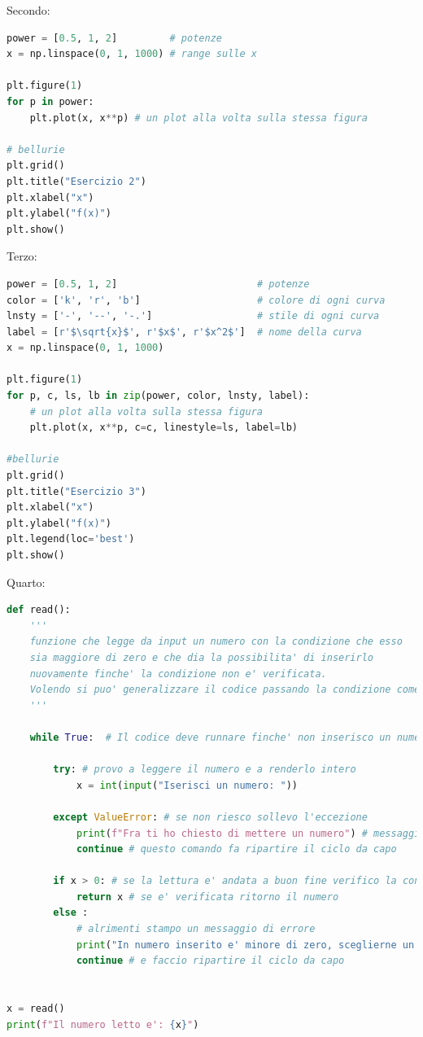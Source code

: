 \documentclass[10pt,a4paper]{article}
\begin{document}
\FloatBarrier
\noindent Secondo:
\begin{lstlisting}[language=Python]
power = [0.5, 1, 2]         # potenze
x = np.linspace(0, 1, 1000) # range sulle x

plt.figure(1)
for p in power:
    plt.plot(x, x**p) # un plot alla volta sulla stessa figura

# bellurie
plt.grid()
plt.title("Esercizio 2")
plt.xlabel("x")
plt.ylabel("f(x)")
plt.show()
\end{lstlisting}
Terzo:
\begin{lstlisting}[language=Python]
power = [0.5, 1, 2]                        # potenze
color = ['k', 'r', 'b']                    # colore di ogni curva
lnsty = ['-', '--', '-.']                  # stile di ogni curva
label = [r'$\sqrt{x}$', r'$x$', r'$x^2$']  # nome della curva
x = np.linspace(0, 1, 1000)

plt.figure(1)
for p, c, ls, lb in zip(power, color, lnsty, label):
    # un plot alla volta sulla stessa figura
    plt.plot(x, x**p, c=c, linestyle=ls, label=lb)

#bellurie
plt.grid()
plt.title("Esercizio 3")
plt.xlabel("x")
plt.ylabel("f(x)")
plt.legend(loc='best')
plt.show()
\end{lstlisting}
Quarto:
\begin{lstlisting}[language=Python]
def read():
    '''
    funzione che legge da input un numero con la condizione che esso
    sia maggiore di zero e che dia la possibilita' di inserirlo
    nuovamente finche' la condizione non e' verificata.
    Volendo si puo' generalizzare il codice passando la condizione come input
    '''
    
    while True:  # Il codice deve runnare finche' non inserisco un numero buono
        
        try: # provo a leggere il numero e a renderlo intero
            x = int(input("Iserisci un numero: "))
            
        except ValueError: # se non riesco sollevo l'eccezione
            print(f"Fra ti ho chiesto di mettere un numero") # messaggio di errore
            continue # questo comando fa ripartire il ciclo da capo
        
        if x > 0: # se la lettura e' andata a buon fine verifico la condizione
            return x # se e' verificata ritorno il numero
        else :
            # alrimenti stampo un messaggio di errore
            print("In numero inserito e' minore di zero, sceglierne un altro.")
            continue # e faccio ripartire il ciclo da capo


x = read()
print(f"Il numero letto e': {x}")
\end{lstlisting}
\end{document}
